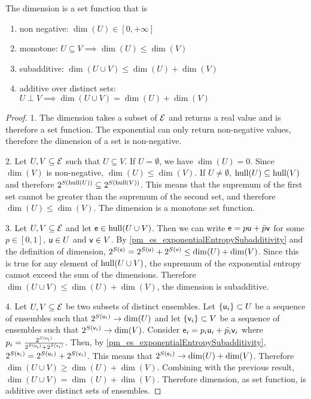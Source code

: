 \begin{prop}
	The dimension is a set function that is
	\begin{enumerate}
		\item non negative: $\dim(U) \in [0, +\infty]$
		\item monotone: $U \subseteq V \implies \dim(U) \leq \dim(V)$
		\item subadditive: $\dim(U \cup V) \leq \dim(U) + \dim(V)$
		\item additive over distinct sets: $U \perp V \implies \dim(U \cup V) = \dim(U) + \dim(V)$ 
	\end{enumerate}
\end{prop}

\begin{proof}
	1. The dimension takes a subset of $\Ens$ and returns a real value and is therefore a set function. The exponential can only return non-negative values, therefore the dimension of a set is non-negative. 
	
	2. Let $U, V \subseteq \Ens$ such that $U \subseteq V$. If $U = \emptyset$, we have $\dim(U) = 0$. Since $\dim(V)$ is non-negative, $\dim(U) \leq \dim(V)$. If $U \neq \emptyset$, $\hull(U) \subseteq \hull(V)$ and therefore $2^{S(\hull(U))} \subseteq 2^{S(\hull(V))}$. This means that the supremum of the first set cannot be greater than the supremum of the second set, and therefore $\dim(U) \leq \dim(V)$. The dimension is a monotone set function.
	
	3. Let $U, V \subseteq \Ens$ and let $\ens \in \hull(U \cup V)$. Then we can write $\ens = p \ens[u] + \bar{p} \ens[v]$ for some $p \in [0,1]$, $\ens[u] \in U$ and $\ens[v] \in V$. By \ref{pm_es_exponentialEntropySubadditivity} and the definition of dimension, $2^{S(\ens)} = 2^{S(\ens[u])} + 2^{S(\ens[v])} \leq \dim(U) + \dim(V)$. Since this is true for any element of $\hull(U \cup V)$, the supremum of the exponential entropy cannot exceed the sum of the dimensions. Therefore $\dim(U \cup V) \leq \dim(U) + \dim(V)$, the dimension is subadditive.
	
	4. Let $U, V \subseteq \Ens$ be two subsets of distinct ensembles. Let $\{\ens[u]_i\} \subset U$ be a sequence of ensembles such that $2^{S(\ens[u]_i)} \to \dim(U)$ and let $\{\ens[v]_i\} \subset V$ be a sequence of ensembles such that $2^{S(\ens[v]_i)} \to \dim(V)$. Consider $\ens_i = p_i \ens[u]_i + \bar{p_i} \ens[v]_i$ where $p_i = \frac{2^{S(\ens[u]_i)}}{2^{S(\ens[u]_i)} + 2^{S(\ens[v]_i)}}$. Then, by \ref{pm_es_exponentialEntropySubadditivity}, $2^{S(\ens_i)} = 2^{S(\ens[u]_i)} + 2^{S(\ens[v]_i)}$. This means that $2^{S(\ens_i)} \to \dim(U) + \dim(V)$. Therefore $\dim(U \cup V) \geq \dim(U) + \dim(V)$. Combining with the previous result, $\dim(U \cup V) = \dim(U) + \dim(V)$. Therefore dimension, as set function, is additive over distinct sets of ensembles.
\end{proof}

